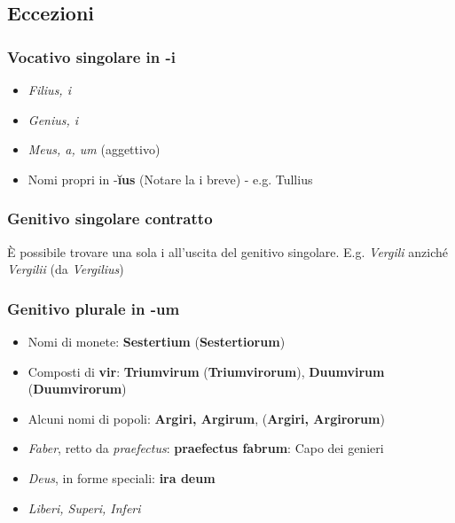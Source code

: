 \subsection{Eccezioni}
\subsubsection*{Vocativo singolare in -i}
\begin{itemize}
    \item \textit{Filius, i}
    \item \textit{Genius, i}
    \item \textit{Meus, a, um} (aggettivo)
    \item Nomi propri in -\textbf{\u{i}us} (Notare la i breve) - e.g. Tullius
\end{itemize}

\subsubsection*{Genitivo singolare contratto}
\`E possibile trovare una sola i all'uscita del genitivo singolare. E.g. \textit{Vergili} anzich\'e
\textit{Vergilii} (da \textit{Vergilius})

\subsubsection*{Genitivo plurale in -um}
\begin{itemize}
    \item Nomi di monete: \textbf{Sestertium} (\textbf{Sestertiorum})
    \item Composti di \textbf{vir}: \textbf{Triumvirum} (\textbf{Triumvirorum}), \textbf{Duumvirum} (\textbf{Duumvirorum})
    \item Alcuni nomi di popoli: \textbf{Argiri, Argirum}, (\textbf{Argiri, Argirorum})
    \item \textit{Faber}, retto da \textit{praefectus}: \textbf{praefectus fabrum}: Capo dei genieri
    \item \textit{Deus}, in forme speciali: \textbf{ira deum}
    \item \textit{Liberi, Superi, Inferi}
\end{itemize}

